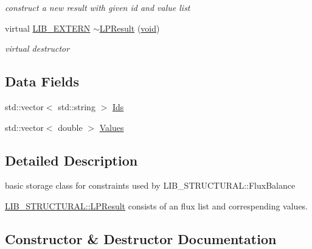 \begin{DoxyCompactItemize}
\begin{DoxyCompactList}\small\item\em construct a new result with given id and value list \end{DoxyCompactList}\item 
virtual \hyperlink{libutil_8h_a48cc004c21e097c0d7c1c5fa8dc03b96}{L\+I\+B\+\_\+\+E\+X\+T\+E\+RN} \hyperlink{class_l_i_b___s_t_r_u_c_t_u_r_a_l_1_1_l_p_result_a63b3873547ae64d1757a252fc1f38089}{$\sim$\+L\+P\+Result} (\hyperlink{lp__lib_8h_ac7828c7b2b31d2e11af17bdb6289c5d9}{void})
\begin{DoxyCompactList}\small\item\em virtual destructor \end{DoxyCompactList}\end{DoxyCompactItemize}
\subsection*{Data Fields}
\begin{DoxyCompactItemize}
\item 
std\+::vector$<$ std\+::string $>$ \hyperlink{class_l_i_b___s_t_r_u_c_t_u_r_a_l_1_1_l_p_result_a8f6e0cb975a2f74d448d127938c18e9b}{Ids}
\item 
std\+::vector$<$ double $>$ \hyperlink{class_l_i_b___s_t_r_u_c_t_u_r_a_l_1_1_l_p_result_a74ac4fa6befc2f1b07512030de7aaa59}{Values}
\end{DoxyCompactItemize}


\subsection{Detailed Description}
basic storage class for constraints used by L\+I\+B\+\_\+\+S\+T\+R\+U\+C\+T\+U\+R\+A\+L\+::\+Flux\+Balance 

\begin{DoxyParagraph}{}
\hyperlink{class_l_i_b___s_t_r_u_c_t_u_r_a_l_1_1_l_p_result}{L\+I\+B\+\_\+\+S\+T\+R\+U\+C\+T\+U\+R\+A\+L\+::\+L\+P\+Result} consists of an flux list and correspending values. 
\end{DoxyParagraph}


\subsection{Constructor \& Destructor Documentation}
\mbox{\label{class_l_i_b___s_t_r_u_c_t_u_r_a_l_1_1_l_p_result_a7203330664051aef76d594cbb03e2afd}} 
